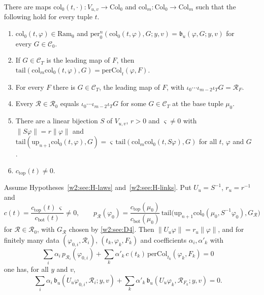 \begin{hypothesis}\label{w2:see:H-links}
There are maps $\mathrm{col}_0(t,\cdot)\colon V_{u,v}\to\mathrm{Col}_0$ and $\mathrm{col}_m\colon\mathrm{Col}_0\to\mathrm{Col}_m$ such that the following hold for every tuple $t$.
\begin{enumerate}[label=(D\arabic*),leftmargin=*]
\item\label{w2:see:D1} $\mathrm{col}_0(t,\varphi)\in\mathrm{Ram}_0$ and $\mathrm{per}^n_0(\mathrm{col}_0(t,\varphi),G;y,v)=\mathfrak b_u(\varphi,G;y,v)$ for every $G\in\mathcal C_0$.
\item\label{w2:see:D2} If $G\in\mathcal C_T$ is the leading map of $F$, then $\mathrm{tail}(\mathrm{col}_m\mathrm{col}_0(t,\varphi),G)=\mathrm{perCol}_t(\varphi,F)$.
\item\label{w2:see:D3} For every $F$ there is $G\in\mathcal C_T$, the leading map of $F$, with $\iota_0\cdots\iota_{m-2}\iota_TG=\mathcal R_F$.
\item\label{w2:see:D4} Every $\mathcal R\in\mathcal R_0$ equals $\iota_0\cdots\iota_{m-2}\iota_TG$ for some $G\in\mathcal C_T$ at the base tuple $\mu_0$.
\item\label{w2:see:D5} There are a linear bijection $S$ of $V_{u,v}$, $r>0$ and $\varsigma\ne0$ with $\lVert S\varphi\rVert=r\lVert\varphi\rVert$ and $\mathrm{tail}(\mathrm{up}_{n+1}\mathrm{col}_0(t,\varphi),G)=\varsigma\,\mathrm{tail}(\mathrm{col}_m\mathrm{col}_0(t,S\varphi),G)$ for all $t$, $\varphi$ and $G$.
\item\label{w2:see:D6} $c_{\mathrm{top}}(t)\ne0$.
\end{enumerate}
\end{hypothesis}

\begin{corollary}\label{w2:see:cor}
Assume Hypotheses~\ref{w2:see:H-laws} and~\ref{w2:see:H-links}. Put $U_u=S^{-1}$, $r_u=r^{-1}$ and
\begin{equation}\label{w2:see:ct}
c(t)=\frac{c_{\mathrm{top}}(t)\,\varsigma}{c_{\mathrm{bot}}(t)}\ne0,\qquad p_{\mathcal R}(\varphi_0)=\frac{c_{\mathrm{top}}(\mu_0)}{c_{\mathrm{bot}}(\mu_0)}\,\mathrm{tail}\bigl(\mathrm{up}_{n+1}\mathrm{col}_0(\mu_0,S^{-1}\varphi_0),G_{\mathcal R}\bigr)
\end{equation}
for $\mathcal R\in\mathcal R_0$, with $G_{\mathcal R}$ chosen by \ref{w2:see:D4}. Then $\lVert U_u\varphi\rVert=r_u\lVert\varphi\rVert$, and for finitely many data $(\varphi_{0,i},\mathcal R_i)$, $(t_k,\varphi_k,F_k)$ and coefficients $\alpha_i,\alpha'_k$ with
\[
\sum_i\alpha_i\,p_{\mathcal R_i}(\varphi_{0,i})+\sum_k\alpha'_k\,c(t_k)\,\mathrm{perCol}_{t_k}(\varphi_k,F_k)=0
\]
one has, for all $y$ and $v$,
\[
\sum_i\alpha_i\,\mathfrak b_u(U_u\varphi_{0,i},\mathcal R_i;y,v)+\sum_k\alpha'_k\,\mathfrak b_u(U_u\varphi_k,\mathcal R_{F_k};y,v)=0 .
\]
\end{corollary}

